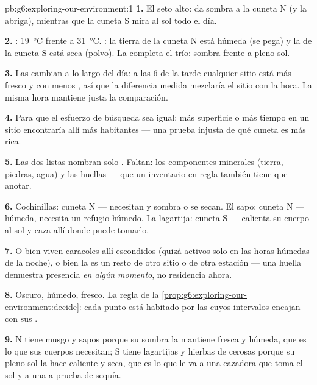 \begin{solution}{pb:g6:exploring-our-environment:1}
\textbf{1.} El seto alto: da sombra a la cuneta N (y la abriga),
mientras que la cuneta S mira al sol todo el día.

\textbf{2.} : \qty{19}{\degreeCelsius} frente a
\qty{31}{\degreeCelsius}. : la tierra de la cuneta N está
húmeda (se pega) y la de la cuneta S está seca (polvo). La 
completa el trío: sombra frente a pleno sol.

\textbf{3.} Las  cambian a lo largo del día: a las 6 de la
tarde cualquier sitio está más fresco y con menos , así que la
diferencia medida mezclaría el sitio con la hora. La misma hora
mantiene justa la comparación.

\textbf{4.} Para que el esfuerzo de búsqueda sea igual: más superficie
o más tiempo en un sitio encontraría allí más habitantes --- una
prueba injusta de qué cuneta es más rica.

\textbf{5.} Las dos listas nombran solo . Faltan: los
componentes minerales (tierra, piedras, agua) y las huellas --- que un
inventario en regla también tiene que anotar.

\textbf{6.} Cochinillas: cuneta N --- necesitan  y sombra o se
secan. El sapo: cuneta N ---  húmeda, necesita un refugio húmedo.
La lagartija: cuneta S --- calienta su cuerpo al sol y caza allí donde
puede tomarlo.

\textbf{7.} O bien viven caracoles allí escondidos (quizá activos solo
en las horas húmedas de la noche), o bien la  es un resto de
otro sitio o de otra estación --- una huella demuestra presencia
\emph{en algún momento}, no residencia ahora.

\textbf{8.} Oscuro, húmedo, fresco. La regla de la
\cref{prop:g6:exploring-our-environment:decide}: cada punto está
habitado por las  cuyos intervalos encajan con sus .

\textbf{9.} N tiene musgo y sapos porque su sombra la mantiene fresca
y húmeda, que es lo que sus cuerpos necesitan; S tiene lagartijas y
hierbas de  cerosas porque su pleno sol la hace caliente y seca,
que es lo que le va a una cazadora que toma el sol y a una  a
prueba de sequía.


\end{solution}
